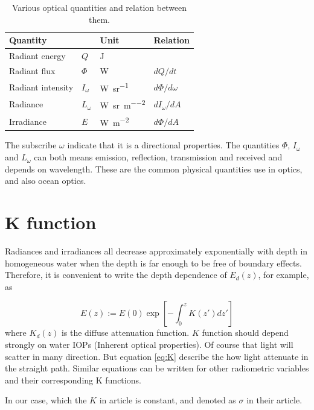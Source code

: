 \documentclass{article}
\begin{document}
\begin{table}[h]
\centering
\begin{tabular}{|l|l|l|l|}
\hline
\multicolumn{2}{|l|}{Quantity} & Unit                                      & Relation         \\ \hline
Radiant energy    & $Q$        & \si{\joule}                               &                  \\ \hline
Radiant flux      & $\Phi$     & \si{\watt}                                & $dQ/dt$          \\ \hline
Radiant intensity & $I_\omega$ & \si{\watt\per\steradian}                  & $d\Phi/d\omega$  \\ \hline
Radiance          & $L_\omega$ & \si{\watt\per\steradian\per\square\meter} & $dI_\omega/dA$   \\ \hline
Irradiance        & $E$        & \si{\watt\per\square\meter}               & $d\Phi/dA$       \\ \hline
\end{tabular}
\caption{Various optical quantities and relation between them.}
\label{tab:optic}
\end{table}
The subscribe $\omega$ indicate that it is a directional properties. The quantities $\Phi$, $I_\omega$ and $L_\omega$ can both means emission, reflection, transmission and received and depends on wavelength. These are the common physical quantities use in optics, and also ocean optics.
 
\section{K function}
\label{sec:K_func}
Radiances and irradiances all decrease approximately exponentially with depth in homogeneous water when the depth is far enough to be free of boundary effects. Therefore, it is convenient to write the depth dependence of $E_d(z)$, for example, as

\begin{equation}
    E(z) := E(0)\exp[-\int_0^z K(z')dz']
    \label{eq:K}
\end{equation}
where $K_d(z)$ is the diffuse attenuation function. $K$ function should depend strongly on water IOPs (Inherent optical properties). Of course that light will scatter in many direction. But equation \ref{eq:K} describe the how light attenuate in the straight path. Similar equations can be written for other radiometric variables and their corresponding K functions.

In our case, which the $K$ in article \cite{gupta2008controlling} is constant, and denoted as $\sigma$ in their article. 
\end{document}
